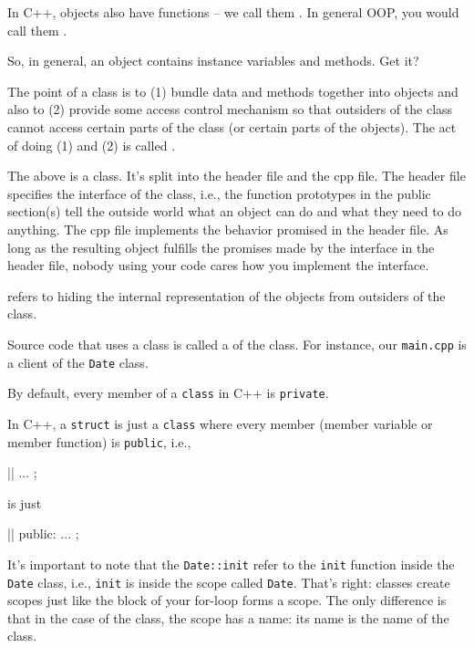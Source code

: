 In C++, objects also have functions -- we call them . In general OOP, you would call them .

So, in general, an object contains instance variables and methods. Get it?

The point of a class is to (1) bundle data and methods together into
objects and also to (2) provide some access control mechanism so that
outsiders of the class cannot access certain parts of the class (or
certain parts of the objects). The act of doing (1) and (2) is called
.

The above is a class. It's split into the header file and the cpp file. The
header file specifies the interface of the class, i.e., the function
prototypes in the public section(s) tell the outside world what an object
can do and what they need to do anything. The cpp file implements the
behavior promised in the header file. As long as the resulting object
fulfills the promises made by the interface in the header file, nobody
using your code cares how you implement the interface.

 refers to hiding the internal representation
of the objects from outsiders of the class.

Source code that uses a class is called a  of the
class. For instance, our \texttt{main.cpp} is a client of the
\texttt{Date} class.

By default, every member of a \texttt{class} in C++ is \texttt{private}.

In C++, a \texttt{struct} is just a \texttt{class} where every member
(member variable or member function) is \texttt{public}, i.e.,

\begin{consolethree}[escapeinside=||]
||
{
    ...
};
\end{consolethree}

is just

\begin{consolethree}[escapeinside=||]
||
{
public:
    ...
};
\end{consolethree}


\newpage{}

It's important to note that the \texttt{Date::init} refer
to the \texttt{init} function inside the \texttt{Date} class, i.e.,
\texttt{init} is inside the scope called \texttt{Date}.
That's right: classes create scopes just like the block
of your for-loop forms a scope. The only difference is that in the case
of the class, the scope has a name: its name is the name of the class.

